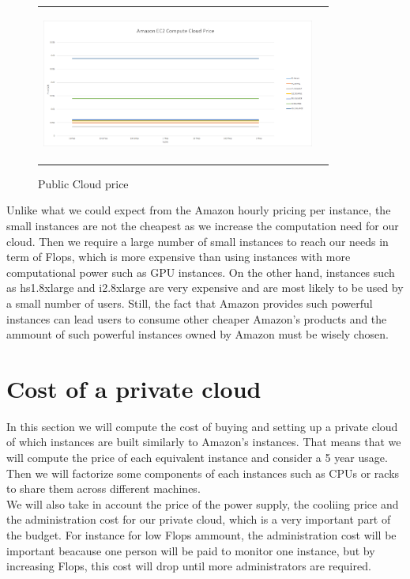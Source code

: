 \documentclass[12pt,journal, a4paper]{IEEEtran}
\begin{document}
\begin{figure}[H]
\centering
\captionsetup{justification=centering}
\begin{tabular}{cc}
\includegraphics[width=9cm, height=5cm]{Cloud_Amazon_price.png}
\end{tabular}
\caption{Public Cloud price}
\end{figure}

Unlike what we could expect from the Amazon hourly pricing per instance, the small instances are not the cheapest as we increase the computation need for our cloud. Then we require a large number of small instances to reach our needs in term of Flops, which is more expensive than using instances with more computational power such as GPU instances. On the other hand, instances such as hs1.8xlarge and i2.8xlarge are very expensive and are most likely to be used by a small number of users. Still, the fact that Amazon provides such powerful instances can lead users to consume other cheaper Amazon's products and the ammount of such powerful instances owned by Amazon must be wisely chosen. 
 

   
\section{Cost of a private cloud}

In this section we will compute the cost of buying and setting up a private cloud of which instances are built similarly to Amazon's instances. That means that we will compute the price of each equivalent instance and consider a 5 year usage. Then we will factorize some components of each instances such as CPUs or racks to share them across different machines.\\

We will also take in account the price of the power supply, the cooliing price and the administration cost for our private cloud, which is a very important part of the budget. For instance for low Flops ammount, the administration cost will be important beacause one person will be paid to monitor one instance, but by increasing Flops, this cost will drop until more administrators are required.\\
\end{document}
